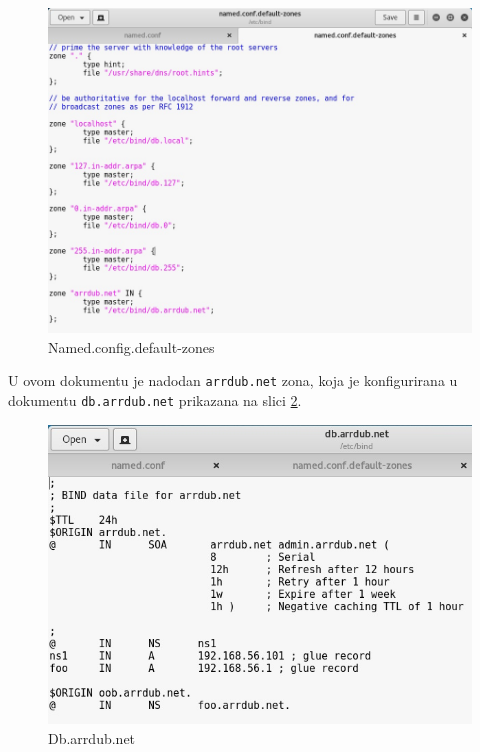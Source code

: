 \documentclass[12pt, oneside, onecolumn]{book}
\begin{document}
{\begin{figure}[H]
	\begin{center}
		\includegraphics[width=\textwidth]{bsqli_ncdz.jpg}
		\caption{Named.config.default-zones} \label{fig:bsqli_ncdz}
	\end{center}
\end{figure}

U ovom dokumentu je nadodan \texttt{arrdub.net} zona, koja je konfigurirana u dokumentu \texttt{db.arrdub.net} prikazana na slici \ref{fig:bsqli_dan}. 

\begin{figure}[H]
	\begin{center}
		\includegraphics[width=\textwidth]{bsqli_dan.jpg}
		\caption{Db.arrdub.net} \label{fig:bsqli_dan}
	\end{center}
\end{figure}

}
\end{document}
